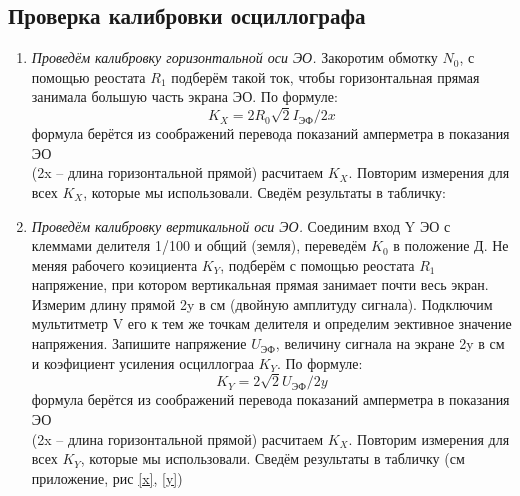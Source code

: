 \documentclass[14pt,a4paper]{article}
\begin{document}
\subsection*{Проверка калибровки осциллографа}
\begin{enumerate}
  \item \textit{Проведём калибровку горизонтальной оси ЭО.} Закоротим обмотку $N_0$, с помощью реостата  $R_1$ подберём такой ток, чтобы горизонтальная прямая занимала большую часть экрана ЭО. По формуле:
  $$K_X=2R_0\sqrt{2}I_\text{ЭФ} / 2x$$
  \footnotesize формула берётся из соображений перевода показаний амперметра в показания ЭО \normalsize\\
  (2x -- длина горизонтальной прямой) расчитаем $K_X$. Повторим измерения для всех $K_X$, которые мы использовали. Сведём результаты в табличку:
  
  \item \textit{Проведём калибровку вертикальной оси ЭО.} Соединим
  вход Y ЭО с клеммами делителя 1/100 и общий (земля), переведём $K_0$ в положение Д. Не меняя рабочего коэициента $K_Y$, подберём с
  помощью реостата $R_1$ напряжение, при котором вертикальная прямая занимает почти весь экран. Измерим длину прямой 2y в см (двойную амплитуду
  сигнала).
  Подключим мультитметр V его к тем же
  точкам делителя и определим эективное значение напряжения.
  Запишите напряжение $U_\text{ЭФ}$, величину сигнала на экране 2y в см и коэфициент усиления осциллограа $K_Y$. По формуле:
  $$K_Y=2\sqrt{2}U_\text{ЭФ} / 2y$$
  \footnotesize формула берётся из соображений перевода показаний амперметра в показания ЭО \normalsize\\
  (2x -- длина горизонтальной прямой) расчитаем $K_X$.
  Повторим измерения для всех $K_Y$, которые мы использовали. Сведём результаты в табличку (см приложение, рис \ref{x}, \ref{y})
\end{enumerate}
\end{document}
